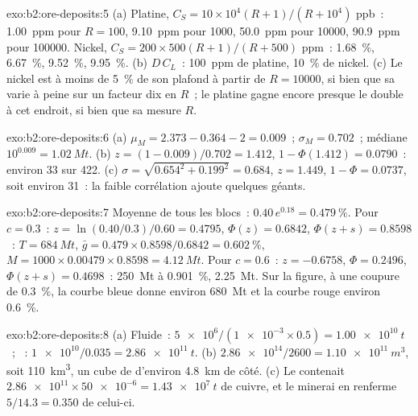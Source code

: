 \begin{solution}{exo:b2:ore-deposits:5}
(a) Platine, $C_S = 10 \times 10^4 (R + 1)/(R + 10^4)$ ppb~: \qty{1.00}{ppm} pour $R = 100$, \qty{9.10}{ppm}
pour \num{1000}, \qty{50.0}{ppm} pour \num{10000}, \qty{90.9}{ppm} pour \num{100000}.
Nickel, $C_S = 200 \times 500 (R + 1)/(R + 500)$ ppm~: \qty{1.68}{\percent}, \qty{6.67}{\percent},
\qty{9.52}{\percent}, \qty{9.95}{\percent}. (b) $D\,C_L$~: \qty{100}{ppm} de platine,
\qty{10}{\percent} de nickel. (c) Le nickel est à moins de \qty{5}{\percent} de son plafond
à partir de $R = \num{10000}$, si bien que sa  varie à peine sur un facteur dix en $R$~;
le platine gagne encore presque le double à cet endroit, si bien que sa  mesure $R$.
\end{solution}

\begin{solution}{exo:b2:ore-deposits:6}
(a) $\mu_M = 2.373 - 0.364 - 2 = 0.009$~; $\sigma_M = 0.702$~; médiane $10^{0.009} = \qty{1.02}{Mt}$.
(b) $z = (1 - 0.009)/0.702 = 1.412$, $1 - \Phi(1.412) = 0.0790$~: environ
33  sur 422. (c) $\sigma = \sqrt{0.654^2 + 0.199^2} = 0.684$, $z = 1.449$,
$1 - \Phi = 0.0737$, soit environ 31~: la faible corrélation ajoute quelques géants.
\end{solution}

\begin{solution}{exo:b2:ore-deposits:7}
Moyenne de tous les blocs~: $0.40\,e^{0.18} = \qty{0.479}{\percent}$. Pour $c = 0.3$~: $z = \ln(0.40/0.3)/0.60 =
0.4795$, $\Phi(z) = 0.6842$, $\Phi(z + s) = 0.8598$~: $T = \qty{684}{Mt}$, $\bar g = 0.479 \times
0.8598/0.6842 = \qty{0.602}{\percent}$, $M = 1000 \times 0.00479 \times 0.8598 = \qty{4.12}{Mt}$.
Pour $c = 0.6$~: $z = -0.6758$, $\Phi = 0.2496$, $\Phi(z + s) = 0.4698$~: \qty{250}{Mt} à
\qty{0.901}{\percent}, \qty{2.25}{Mt}. Sur la figure, à une coupure de \qty{0.3}{\percent}, la courbe bleue
donne environ \qty{680}{Mt} et la courbe rouge environ \qty{0.6}{\percent}.
\end{solution}

\begin{solution}{exo:b2:ore-deposits:8}
(a) Fluide~: $\num{5e6}/(\num{1e-3} \times 0.5) = \qty{1.00e10}{t}$~; ~: $\num{1e10}/0.035 =
\qty{2.86e11}{t}$. (b) $\num{2.86e14}/2600 = \qty{1.10e11}{m^3}$, soit \qty{110}{km^3}, un cube de 
d'environ \qty{4.8}{km} de côté. (c) Le  contenait $\num{2.86e11}
\times \num{50e-6} = \qty{1.43e7}{t}$ de cuivre, et le minerai en renferme $5/14.3 = 0.350$ de celui-ci.
\end{solution}

